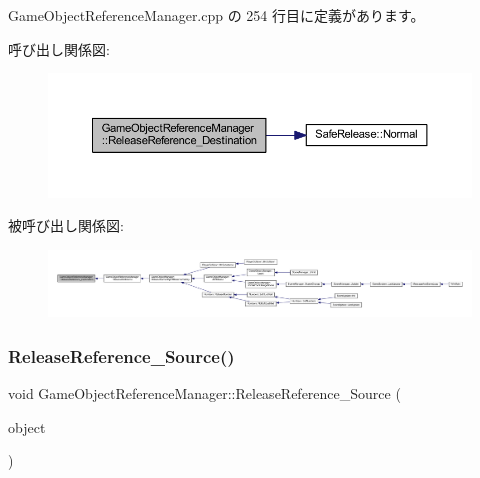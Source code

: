  Game\+Object\+Reference\+Manager.\+cpp の 254 行目に定義があります。

呼び出し関係図\+:\nopagebreak
\begin{figure}[H]
\begin{center}
\leavevmode
\includegraphics[width=350pt]{class_game_object_reference_manager_af3583b94e782a7a881abba2f6be2888c_cgraph}
\end{center}
\end{figure}
被呼び出し関係図\+:
\nopagebreak
\begin{figure}[H]
\begin{center}
\leavevmode
\includegraphics[width=350pt]{class_game_object_reference_manager_af3583b94e782a7a881abba2f6be2888c_icgraph}
\end{center}
\end{figure}
\mbox{\label{class_game_object_reference_manager_afe2c3af4a929f25c87ac2253d9b763f7}} 
\subsubsection{\texorpdfstring{Release\+Reference\+\_\+\+Source()}{ReleaseReference\_Source()}}
{\footnotesize\ttfamily void Game\+Object\+Reference\+Manager\+::\+Release\+Reference\+\_\+\+Source (\begin{DoxyParamCaption}\item[{\mbox{\hyperlink{class_game_object_base}{Game\+Object\+Base}} $\ast$}]{object }\end{DoxyParamCaption})\hspace{0.3cm}{\ttfamily [private]}}



